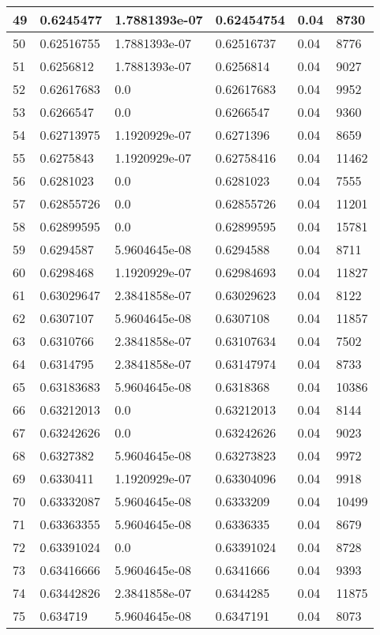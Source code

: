 \begin{longtable}{|l|l|l|l|l|l|}
49 & 0.6245477 & 1.7881393e-07 & 0.62454754 & 0.04 & 8730 \\ \hline 
50 & 0.62516755 & 1.7881393e-07 & 0.62516737 & 0.04 & 8776 \\ \hline 
51 & 0.6256812 & 1.7881393e-07 & 0.6256814 & 0.04 & 9027 \\ \hline 
52 & 0.62617683 & 0.0 & 0.62617683 & 0.04 & 9952 \\ \hline 
53 & 0.6266547 & 0.0 & 0.6266547 & 0.04 & 9360 \\ \hline 
54 & 0.62713975 & 1.1920929e-07 & 0.6271396 & 0.04 & 8659 \\ \hline 
55 & 0.6275843 & 1.1920929e-07 & 0.62758416 & 0.04 & 11462 \\ \hline 
56 & 0.6281023 & 0.0 & 0.6281023 & 0.04 & 7555 \\ \hline 
57 & 0.62855726 & 0.0 & 0.62855726 & 0.04 & 11201 \\ \hline 
58 & 0.62899595 & 0.0 & 0.62899595 & 0.04 & 15781 \\ \hline 
59 & 0.6294587 & 5.9604645e-08 & 0.6294588 & 0.04 & 8711 \\ \hline 
60 & 0.6298468 & 1.1920929e-07 & 0.62984693 & 0.04 & 11827 \\ \hline 
61 & 0.63029647 & 2.3841858e-07 & 0.63029623 & 0.04 & 8122 \\ \hline 
62 & 0.6307107 & 5.9604645e-08 & 0.6307108 & 0.04 & 11857 \\ \hline 
63 & 0.6310766 & 2.3841858e-07 & 0.63107634 & 0.04 & 7502 \\ \hline 
64 & 0.6314795 & 2.3841858e-07 & 0.63147974 & 0.04 & 8733 \\ \hline 
65 & 0.63183683 & 5.9604645e-08 & 0.6318368 & 0.04 & 10386 \\ \hline 
66 & 0.63212013 & 0.0 & 0.63212013 & 0.04 & 8144 \\ \hline 
67 & 0.63242626 & 0.0 & 0.63242626 & 0.04 & 9023 \\ \hline 
68 & 0.6327382 & 5.9604645e-08 & 0.63273823 & 0.04 & 9972 \\ \hline 
69 & 0.6330411 & 1.1920929e-07 & 0.63304096 & 0.04 & 9918 \\ \hline 
70 & 0.63332087 & 5.9604645e-08 & 0.6333209 & 0.04 & 10499 \\ \hline 
71 & 0.63363355 & 5.9604645e-08 & 0.6336335 & 0.04 & 8679 \\ \hline 
72 & 0.63391024 & 0.0 & 0.63391024 & 0.04 & 8728 \\ \hline 
73 & 0.63416666 & 5.9604645e-08 & 0.6341666 & 0.04 & 9393 \\ \hline 
74 & 0.63442826 & 2.3841858e-07 & 0.6344285 & 0.04 & 11875 \\ \hline 
75 & 0.634719 & 5.9604645e-08 & 0.6347191 & 0.04 & 8073 \\ \hline 
\end{longtable}